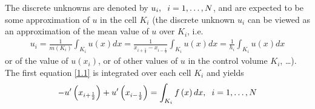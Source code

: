 \documentclass[a4paper]{article}
\numberwithin{equation}{section}
\begin{document}
The discrete unknowns are denoted by $u_i,\hspace{0.2cm}i=1,\ldots,N$, and are expected to be some approximation of $u$ in the cell $K_i$ (the discrete unknown $u_i$ can be viewed as an approximation of the mean value of $u$ over $K_i$, i.e.
\begin{align}
{u_i} = \frac{1}{{m\left( {{K_i}} \right)}}\int_{{K_i}} {u\left( x \right)dx}  = \frac{1}{{{x_{i + \frac{1}{2}}} - {x_{i - \frac{1}{2}}}}}\int_{{K_i}} {u\left( x \right)dx}  = \frac{1}{{{h_i}}}\int_{{K_i}} {u\left( x \right)dx} 
\end{align}
or of the value of $u\left(x_i\right)$, or of other values of $u$ in the control volume $K_i$, \ldots). The first equation \eqref{1.1} is integrated over each cell $K_i$ and yields
\begin{align}
\label{1.13}
 - {u'}\left( {{x_{i + \frac{1}{2}}}} \right) + {u'}\left( {{x_{i - \frac{1}{2}}}} \right) = \int_{{K_i}} {f\left( x \right)dx} ,\hspace{0.2cm} i = 1, \ldots ,N
\end{align}
\end{document}
